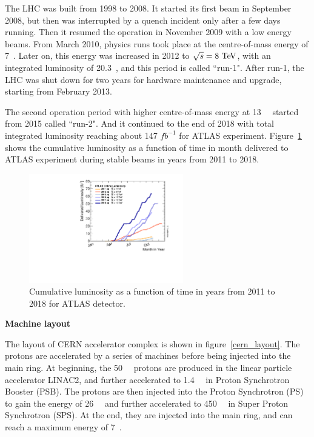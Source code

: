 The LHC was built from 1998 to 2008. 
It started its first beam in September 2008, but then was interrupted by a quench incident only after a few days running.
Then it resumed the operation in November 2009 with a low energy beams.
From March 2010, physics runs took place at the centre-of-mass energy of 7~\tev.
Later on, this energy was increased in 2012 to $\sqrt{s} = 8~\text{Te\kern -0.1em V}$, with an integrated luminosity of 20.3~\ifb, and this period is called ``run-1".
After run-1, the LHC was shut down for two years for hardware maintenance and upgrade, starting from February 2013.

The second operation period with higher centre-of-mass energy at 13~\tev~ started from 2015 called ``run-2".
And it continued to the end of 2018 with total integrated luminosity reaching about 147 $fb^{-1}$ for ATLAS experiment.
Figure~\ref{fig:lumi_vs_month} shows the cumulative luminosity as a function of time in month delivered to ATLAS experiment during stable beams 
in years from 2011 to 2018.
\begin{figure}[!htb]
  \centering
  \includegraphics[width=0.6\textwidth]{figures/Detector/intlumivsyear.pdf}
  \caption{Cumulative luminosity as a function of time in years from 2011 to 2018 for ATLAS detector.}
  \label{fig:lumi_vs_month}
\end{figure}

\textbf{Machine layout}

The layout of CERN accelerator complex is shown in figure~\ref{cern_layout}.
The protons are accelerated by a series of machines before being injected into the main ring.
At beginning, the 50~\mev~ protons are produced in the linear particle accelerator LINAC2, 
and further accelerated to 1.4~\gev~ in Proton Synchrotron Booster (PSB).
The protons are then injected into the Proton Synchrotron (PS) to gain the energy of 26~\gev~ and further accelerated to 450~\gev~ in Super Proton Synchrotron (SPS).
At the end, they are injected into the main ring, and can reach a maximum energy of 7~\tev.

